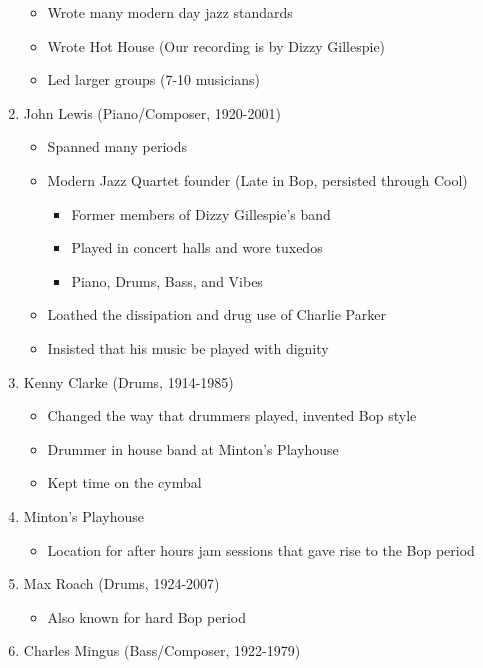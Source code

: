 \documentclass[]{article}
\providecommand{\tightlist}{%
  \setlength{\itemsep}{0pt}\setlength{\parskip}{0pt}}
\begin{document}
\begin{enumerate}
  \begin{itemize}
  \tightlist
  \item
    Wrote many modern day jazz standards
  \item
    Wrote Hot House (Our recording is by Dizzy Gillespie)
  \item
    Led larger groups (7-10 musicians)
  \end{itemize}
\item
  John Lewis (Piano/Composer, 1920-2001)

  \begin{itemize}
  \tightlist
  \item
    Spanned many periods
  \item
    Modern Jazz Quartet founder (Late in Bop, persisted through Cool)

    \begin{itemize}
    \tightlist
    \item
      Former members of Dizzy Gillespie's band
    \item
      Played in concert halls and wore tuxedos
    \item
      Piano, Drums, Bass, and Vibes
    \end{itemize}
  \item
    Loathed the dissipation and drug use of Charlie Parker
  \item
    Insisted that his music be played with dignity
  \end{itemize}
\item
  Kenny Clarke (Drums, 1914-1985)

  \begin{itemize}
  \tightlist
  \item
    Changed the way that drummers played, invented Bop style
  \item
    Drummer in house band at Minton's Playhouse
  \item
    Kept time on the cymbal
  \end{itemize}
\item
  Minton's Playhouse

  \begin{itemize}
  \tightlist
  \item
    Location for after hours jam sessions that gave rise to the Bop
    period
  \end{itemize}
\item
  Max Roach (Drums, 1924-2007)

  \begin{itemize}
  \tightlist
  \item
    Also known for hard Bop period
  \end{itemize}
\item
  Charles Mingus (Bass/Composer, 1922-1979)


\end{enumerate}
\end{document}

